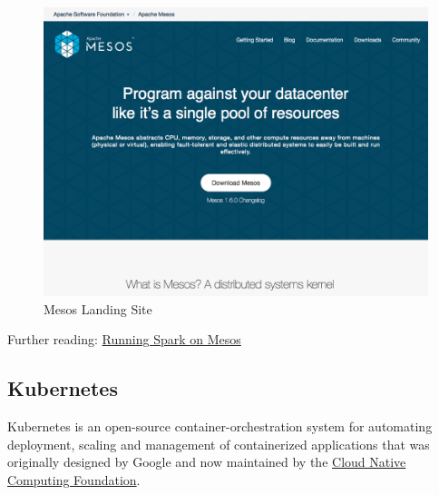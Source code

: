 \documentclass[]{book}
\theoremstyle{definition}
\theoremstyle{definition}
\theoremstyle{definition}
\theoremstyle{remark}
\begin{document}
\begin{figure}

{\centering \includegraphics[width=13.78in]{images/05-clusters-mesos} 

}

\caption{Mesos Landing Site}\label{fig:mesos-spark}
\end{figure}

Further reading:
\href{https://spark.apache.org/docs/latest/running-on-mesos.html}{Running
Spark on Mesos}

\hypertarget{kubernetes}{%
\subsection{Kubernetes}\label{kubernetes}}

Kubernetes is an open-source container-orchestration system for
automating deployment, scaling and management of containerized
applications that was originally designed by Google and now maintained
by the \href{https://www.cncf.io/}{Cloud Native Computing Foundation}.
\end{document}
